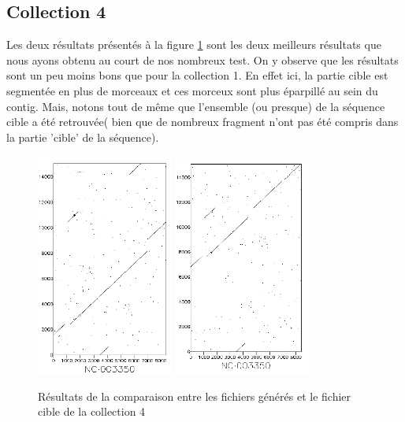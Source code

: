 \documentclass[12pt,a4paper,final]{article}
\begin{document}
\subsection{Collection 4}
Les deux résultats présentés à la figure \ref{coll4} sont les deux meilleurs résultats que nous ayons obtenu au court de nos nombreux test. On y observe que les résultats sont un peu moins bons que pour la collection 1. En effet ici, la partie cible est segmentée en plus de morceaux et ces morceux sont plus éparpillé au sein du contig. Mais, notons tout de même que l'ensemble (ou presque) de la séquence cible a été retrouvée( bien que de nombreux fragment n'ont pas été compris dans la partie 'cible' de la séquence).

\begin{figure}[!ht]
	\centering
	\includegraphics[width=0.4\textwidth]{images/collection4/collection4_2.png}
	\includegraphics[width=0.4\textwidth]{images/collection4/collection4_3.png}
	\caption{\label{coll4}Résultats de la comparaison entre les fichiers générés et le fichier cible de la collection 4}
\end{figure}
\end{document}
